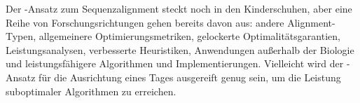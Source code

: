 Der \A-Ansatz zum Sequenzalignment steckt noch in den Kinderschuhen, aber eine
Reihe von Forschungsrichtungen gehen bereits davon aus: andere Alignment-Typen,
allgemeinere Optimierungsmetriken, gelockerte Optimalitätsgarantien,
Leistungsanalysen, verbesserte Heuristiken, Anwendungen außerhalb der Biologie
und leistungsfähigere Algorithmen und Implementierungen. Vielleicht wird der
\A-Ansatz für die Ausrichtung eines Tages ausgereift genug sein, um die Leistung
suboptimaler Algorithmen zu erreichen.
